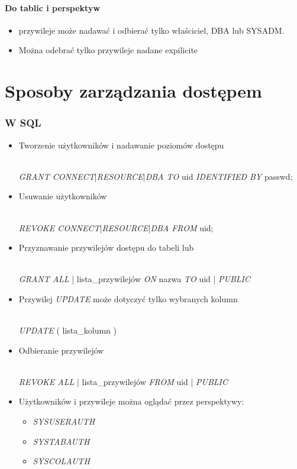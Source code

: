 \documentclass[a4paper,twoside]{article}
\begin{document}
  	\subsection*{Do tablic i perspektyw}
  	\begin{itemize}
  		\item przywileje może nadawać i odbierać tylko właściciel, DBA lub SYSADM.
  		\item Można odebrać tylko przywileje nadane expilicite
  	\end{itemize}
  	
  	
  	\part*{Sposoby zarządzania dostępem}
  	
  	\section*{W SQL}
  	\begin{itemize}
  		\item Tworzenie użytkowników i nadawanie poziomów dostępu\\\\
  		\centerline{\emph{GRANT CONNECT}|\emph{RESOURCE}|\emph{DBA TO} uid \emph{IDENTIFIED BY} passwd;}
  		\item Usuwanie użytkowników\\\\ \centerline{\emph{REVOKE CONNECT}|\emph{RESOURCE}|\emph{DBA FROM} uid;}
  		\item Przyznawanie przywilejów dostępu do tabeli lub\\\\ \centerline{\emph{GRANT ALL} | lista\_przywilejów \emph{ON} nazwa \emph{TO} uid | \emph{PUBLIC} }
  		\item Przywilej \emph{UPDATE} może dotyczyć tylko wybranych kolumn\\\\ \centerline{\emph{UPDATE} ( lista\_kolumn ) }
  		\item Odbieranie przywilejów\\\\ \centerline{\emph{REVOKE ALL} | lista\_przywilejów \emph{FROM} uid | \emph{PUBLIC}}
  		\item Użytkowników i przywileje można oglądać przez perspektywy:
  		\begin{itemize}
  			\item \emph{SYSUSERAUTH}
  			\item \emph{SYSTABAUTH}
  			\item \emph{SYSCOLAUTH}
  		\end{itemize}
  	\end{itemize}
  	
\end{document}
